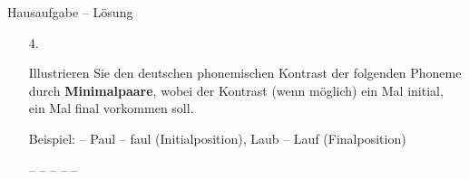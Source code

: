 \begin{frame}{Hausaufgabe -- Lösung}

\begin{itemize}	
\item[4.]{Illustrieren Sie den deutschen phonemischen Kontrast der folgenden Phoneme durch \textbf{Minimalpaare}, wobei der Kontrast (wenn möglich) ein Mal initial,\\ ein Mal final vorkommen soll.

Beispiel: \textipa{[p]} -- \textipa{[f]} Paul -- faul (Initialposition), Laub -- Lauf (Finalposition)}

\begin{exe}
	\settowidth{}
	\begin{xlist}
		\ex \textipa{[m]} -- \textipa{[n]} 
		\ex \textipa{[p]} -- \textipa{[b]} 
		\ex \textipa{[h]} -- \textipa{[v]} 
		\ex \textipa{[n]} -- \textipa{[N]} 
		\ex \textipa{[f]} -- \textipa{[v]} 
	\end{xlist}
\end{exe}
		
\end{itemize}

\end{frame}
